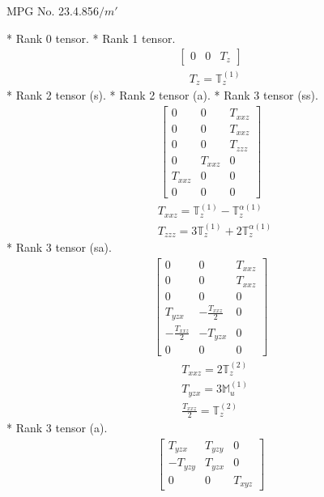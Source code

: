 \documentclass[fleqn,8pt,landscape]{jsarticle}
\begin{document}
\setcounter{MaxMatrixCols}{32}

\renewcommand{\tablename}{Table~}
\renewcommand{\figurename}{Figure~}
\begin{center}
\LARGE
MPG No. 23.4.85\quad$6/m'$
\end{center}
* Rank 0 tensor.
* Rank 1 tensor.
\begin{align*}
\begin{bmatrix} 0 & 0 & T_{z} \end{bmatrix}
\end{align*}
\begin{align*}
& T_{z} = \mathbb{T}_{z}^{(1)}
\end{align*}
* Rank 2 tensor (s).
* Rank 2 tensor (a).
* Rank 3 tensor (ss).
\begin{align*}
\begin{bmatrix} 0 & 0 & T_{xxz} \\ 0 & 0 & T_{xxz} \\ 0 & 0 & T_{zzz} \\ 0 & T_{xxz} & 0 \\ T_{xxz} & 0 & 0 \\ 0 & 0 & 0 \end{bmatrix}
\end{align*}
\begin{align*}
& T_{xxz} = \mathbb{T}_{z}^{(1)} - \mathbb{T}_{z}^{\alpha(1)} \\
& T_{zzz} = 3 \mathbb{T}_{z}^{(1)} + 2 \mathbb{T}_{z}^{\alpha(1)}
\end{align*}
* Rank 3 tensor (sa).
\begin{align*}
\begin{bmatrix} 0 & 0 & T_{xxz} \\ 0 & 0 & T_{xxz} \\ 0 & 0 & 0 \\ T_{yzx} & - \frac{T_{xxz}}{2} & 0 \\ - \frac{T_{xxz}}{2} & - T_{yzx} & 0 \\ 0 & 0 & 0 \end{bmatrix}
\end{align*}
\begin{align*}
& T_{xxz} = 2 \mathbb{T}_{z}^{(2)} \\
& T_{yzx} = 3 \mathbb{M}_{u}^{(1)} \\
& \frac{T_{xxz}}{2} = \mathbb{T}_{z}^{(2)}
\end{align*}
* Rank 3 tensor (a).
\begin{align*}
\begin{bmatrix} T_{yzx} & T_{yzy} & 0 \\ - T_{yzy} & T_{yzx} & 0 \\ 0 & 0 & T_{xyz} \end{bmatrix}
\end{align*}
\end{document}

